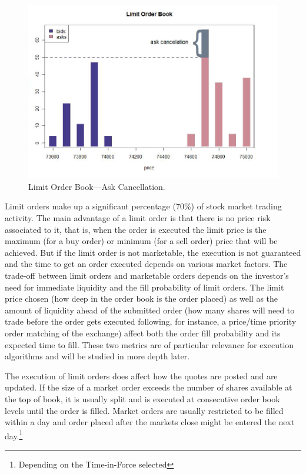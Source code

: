 	\begin{figure}[!ht]
	   \centering
	   \includegraphics[width=\textwidth]{chapters/chapter_trading_fund/figures/limitbk3.png} 
	   \caption{Limit Order Book---Ask Cancellation. \label{fig:limbk3}}
	\end{figure}


Limit orders make up a significant percentage (70\%) of stock market trading activity. The main advantage of a limit order is that there is no price risk associated to it, that is, when the order is executed the limit price is the maximum (for a buy order) or minimum (for a sell order) price that will be achieved. But if the limit order is not marketable, the execution is not guaranteed and the time to get an order executed depends on various market factors. The trade-off between limit orders and marketable orders depends on the investor's need for immediate liquidity and the fill probability of limit orders. The limit price chosen (how deep in the order book is the order placed) as well as the amount of liquidity ahead of the submitted order (how many shares will need to trade before the order gets executed following, for instance, a price/time priority order matching of the exchange) affect both the order fill probability and its expected time to fill. These two metrics are of particular relevance for execution algorithms and will be studied in more depth later. 


The execution of limit orders does affect how the quotes are posted and are updated. If the size of a market order exceeds the number of shares available at the top of book, it is usually split and is executed at consecutive order book levels until the order is filled. Market orders are usually restricted to be filled within a day and order placed after the markets close might be entered the next day.\footnote{Depending on the Time-in-Force selected} \twomedskip


